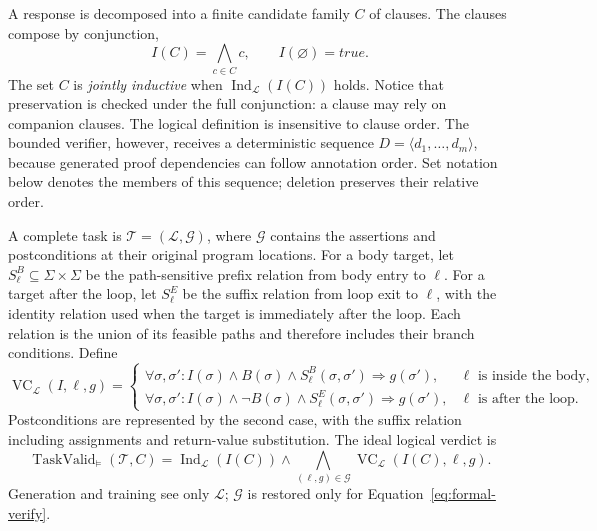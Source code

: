 A response is decomposed into a finite candidate family \(C\) of clauses.  The
clauses compose by conjunction,
\begin{equation}
  I(C)=\bigwedge_{c\in C}c,
  \qquad I(\varnothing)=\mathit{true}.
  \label{eq:formal-compose}
\end{equation}
The set \(C\) is \emph{jointly inductive} when
\(\operatorname{Ind}_{\mathcal L}(I(C))\) holds.  Notice that preservation is
checked under the full conjunction: a clause may rely on companion clauses.
The logical definition is insensitive to clause order.  The bounded verifier,
however, receives a deterministic sequence
\(D=\langle d_1,\ldots,d_m\rangle\), because generated proof dependencies can
follow annotation order.  Set notation below denotes the members of this
sequence; deletion preserves their relative order.

A complete task is \(\mathcal T=(\mathcal L,\mathcal G)\), where
\(\mathcal G\) contains the assertions and postconditions at their original
program locations.  For a body target, let
\(S^{B}_{\ell}\subseteq\Sigma\times\Sigma\) be the path-sensitive prefix
relation from body entry to \(\ell\).  For a target after the loop, let
\(S^{E}_{\ell}\) be the suffix relation from loop exit to \(\ell\), with the
identity relation used when the target is immediately after the loop.  Each
relation is the union of its feasible paths and therefore includes their
branch conditions.  Define
\begin{equation}
  \operatorname{VC}_{\mathcal L}(I,\ell,g)=
  \begin{cases}
    \forall\sigma,\sigma':
    I(\sigma)\land B(\sigma)\land S^{B}_{\ell}(\sigma,\sigma')
    \Rightarrow g(\sigma'),
      & \ell\text{ is inside the body},\\
    \forall\sigma,\sigma':
    I(\sigma)\land\neg B(\sigma)\land S^{E}_{\ell}(\sigma,\sigma')
    \Rightarrow g(\sigma'),
      & \ell\text{ is after the loop}.
  \end{cases}
  \label{eq:formal-target-vc}
\end{equation}
Postconditions are represented by the second case, with the suffix relation
including assignments and return-value substitution.  The ideal logical verdict is
\begin{equation}
  \operatorname{TaskValid}_{\models}(\mathcal T,C)
  =\operatorname{Ind}_{\mathcal L}(I(C))\land
   \bigwedge_{(\ell,g)\in\mathcal G}
   \operatorname{VC}_{\mathcal L}(I(C),\ell,g).
  \label{eq:formal-verify}
\end{equation}
Generation and training see only \(\mathcal L\); \(\mathcal G\) is restored
only for Equation~\eqref{eq:formal-verify}.

